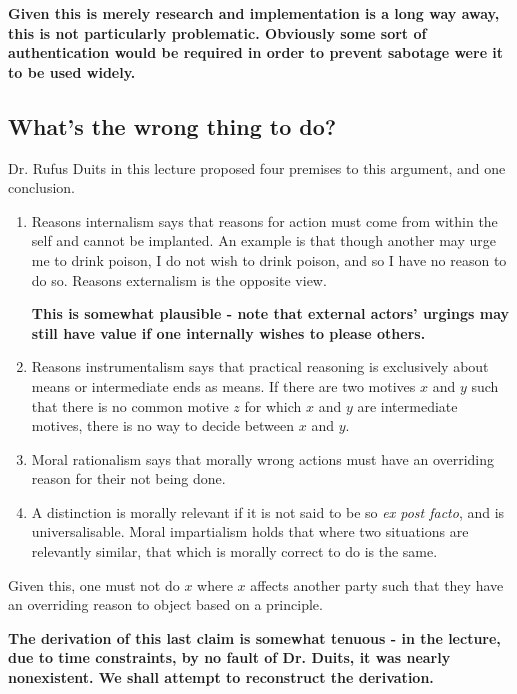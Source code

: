 		\textbf{Given this is merely research and implementation is a long way away, this is not particularly problematic. Obviously some sort of authentication would be required in order to prevent sabotage were it to be used widely.}



	\subsection{What's the wrong thing to do?}



		Dr. Rufus Duits in this lecture proposed four premises to this argument, and one conclusion.

		\begin{enumerate}

			\item Reasons internalism says that reasons for action must come from within the self and cannot be implanted. An example is that though another may urge me to drink poison, I do not wish to drink poison, and so I have no reason to do so. Reasons externalism is the opposite view.

			\textbf{This is somewhat plausible - note that external actors' urgings may still have value if one internally wishes to please others.}

			\item Reasons instrumentalism says that practical reasoning is exclusively about means or intermediate ends as means. If there are two motives \(x\) and \(y\) such that there is no common motive \(z\) for which \(x\) and \(y\) are intermediate motives, there is no way to decide between \(x\) and \(y\).

			\item Moral rationalism says that morally wrong actions must have an overriding reason for their not being done.

			\item A distinction is morally relevant if it is not said to be so \textit{ex post facto}, and is universalisable. Moral impartialism holds that where two situations are relevantly similar, that which is morally correct to do is the same.

		\end{enumerate}

		Given this, one must not do \(x\) where \(x\) affects another party such that they have an overriding reason to object based on a principle.

		\textbf{The derivation of this last claim is somewhat tenuous - in the lecture, due to time constraints, by no fault of Dr. Duits, it was nearly nonexistent. We shall attempt to reconstruct the derivation.}

